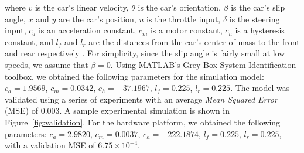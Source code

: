 \documentclass[manuscript,screen,review]{acmart}
\newcommand{\figref}[1]{Figure~\ref{#1}}
\begin{document}
\noindent where $v$ is the car's linear velocity, $\theta$ is the car's orientation, $\beta$ is the car's slip angle, $x$ and $y$ are the car's position, $u$ is the throttle input, $\delta$ is the steering input, $c_a$ is an acceleration constant, $c_m$ is a motor constant, $c_h$ is a hysteresis constant, and $l_f$ and $l_r$ are the distances from the car's center of mass to the front and rear respectively \cite{ivanov2020case}. For simplicity, since the slip angle is fairly small at low speeds, we assume that $\beta = 0$.
Using MATLAB's Grey-Box System Identification toolbox, we obtained the following parameters for the simulation model: $c_a = 1.9569$, $c_m = 0.0342$, $c_h = -37.1967$, $l_f =0.225$, $l_r = 0.225$. The model was validated using a series of experiments %
with an average \emph{Mean Squared Error} (MSE) of $0.003$. A sample experimental simulation is shown in \figref{fig:validation}. For the hardware platform, we obtained the following parameters: $c_a = 2.9820$, $c_m = 0.0037$, $c_h = -222.1874$, $l_f =0.225$, $l_r = 0.225$, with a validation MSE of $6.75 \times 10^{-4}$.









\end{document}
